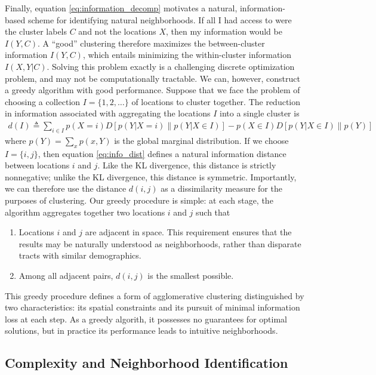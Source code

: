 		Finally, equation \eqref{eq:information_decomp} motivates a natural, information-based scheme for identifying natural neighborhoods. If all I had access to were the cluster labels $C$ and not the locations $X$, then my information would be $I(Y,C)$. A ``good'' clustering therefore maximizes the between-cluster information $I(Y,C)$, which entails minimizing the within-cluster information $I(X,Y|C)$. Solving this problem exactly is a challenging discrete optimization problem, and may not be computationally tractable. We can, however, construct a greedy algorithm with good performance. Suppose that we face the problem of choosing a collection $I = \{1,2,\ldots\}$ of locations to cluster together. The reduction in information associated with aggregating the locations $I$ into a single cluster is 
		\begin{align}
			d(I) \triangleq  \sum_{i \in I} p(X = i)D[p(Y|X = i)\| p(Y|X \in I)] - p(X\in I)D[p(Y|X\in I) \| p(Y)] \label{eq:info_dist}
		\end{align}
		where $p(Y) = \sum_{x} p(x,Y)$ is the global marginal distribution. If we choose $I = \{i,j\}$, then equation \eqref{eq:info_dist} defines a natural information distance between locations $i$ and $j$. Like the KL divergence, this distance is strictly nonnegative; unlike the KL divergence, this distance is symmetric. Importantly, we can therefore use the distance $d(i,j)$ as a dissimilarity measure for the purposes of clustering. Our greedy procedure is simple: at each stage, the algorithm aggregates together two locations $i$ and $j$ such that 
		\begin{enumerate}
			\item Locations $i$ and $j$ are adjacent in space. This requirement ensures that the results may be naturally understood as neighborhoods, rather than disparate tracts with similar demographics.  
			\item Among all adjacent pairs, $d(i,j)$ is the smallest possible. 
		\end{enumerate}
		This greedy procedure defines a form of agglomerative clustering distinguished by two characteristics: its spatial constraints and its pursuit of minimal information loss at each step. As a greedy algorith, it possesses no guarantees for optimal solutions, but in practice its performance leads to intuitive neighborhoods. 

		
	\subsection{Complexity and Neighborhood Identification}